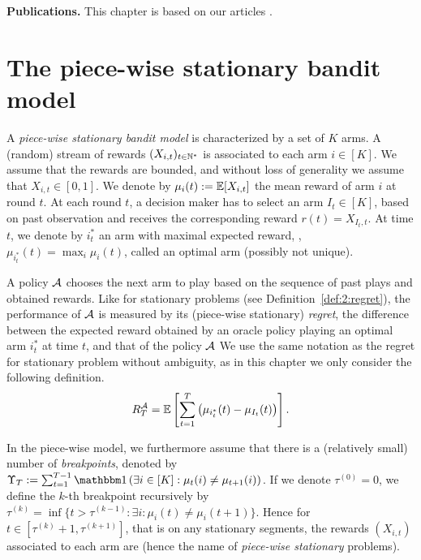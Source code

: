 \textbf{Publications.}
%
This chapter is based on our articles \cite{Besson2019GLRT,Besson2019Gretsi}.


\section{The piece-wise stationary bandit model}
\label{sec:6:BanditSetting}

A \emph{piece-wise stationary bandit model} is characterized by a set of $K$ arms.
A (random) stream of rewards $(X_{i,t})_{t\in\mathbb{N}^*}$ is associated to each arm $i \in [K]$. We assume that the rewards are bounded, and without loss of generality we assume that $X_{i,t} \in [0,1]$. We denote by $\mu_{i}(t) :=  \mathbb{E}[X_{i,t}]$ the mean reward of arm $i$ at round $t$. At each round $t$, a decision maker has to select an arm $I_t\in[K]$, based on past observation and receives the corresponding reward $r(t) = X_{I_t,t}$. At time $t$, we denote by $i_t^*$ an arm with maximal expected reward, \ie, $\mu_{i_t^*}(t) = \max_i \mu_i(t)$, called an optimal arm (possibly not unique).

A policy $\mathcal{A}$ chooses the next arm to play based on the sequence of past plays and obtained rewards.
Like for stationary problems (see Definition~\ref{def:2:regret}), the performance of $\mathcal{A}$ is measured by its (piece-wise stationary) \emph{regret}, the difference between the expected reward obtained by an oracle policy playing an optimal arm $i^*_t$ at time $t$, and that of the policy $\mathcal{A}$
We use the same notation as the regret for stationary problem without ambiguity, as in this chapter we only consider the following definition.
%
\begin{equation}\label{def:6:nti}
    R_T^{\mathcal{A}} = \mathbb{E}\left[\sum_{t=1}^T \left(\mu_{i^*_t}(t) - \mu_{I_t}(t)\right)\right].
\end{equation}


In the piece-wise \iid{} model, we furthermore assume that there is a (relatively small) number of \emph{breakpoints}, denoted by $\Upsilon_T:=\sum_{t=1}^{T-1} \indic\left(\exists i\in[K]: \mu_t(i) \neq \mu_{t+1}(i)\right)$.
If we denote $\tau^{(0)} = 0$, we define the $k$-th breakpoint recursively by
$\tau^{(k)} = \inf\{t > \tau^{(k-1)} : \exists i : \mu_i(t) \neq \mu_{i}(t+1)\}$.
%
Hence for $t\in[\tau^{(k)} + 1,\tau^{(k+1)}]$, that is on any stationary segments, the rewards $(X_{i,t})$ associated to each arm are \iid{} (hence the name of \emph{piece-wise stationary} problems).

